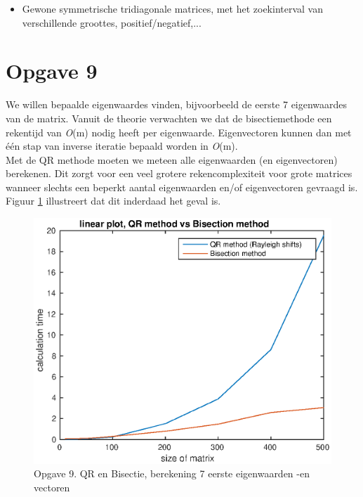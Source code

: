 \documentclass[]{article}
\newcommand{\opgave}[1]{\pagebreak\section*{Opgave #1}}
\begin{document}
\begin{itemize}
	\item Gewone symmetrische tridiagonale matrices, met het zoekinterval van verschillende groottes, positief/negatief,...
\end{itemize}

\opgave{9}
We willen bepaalde eigenwaardes vinden, bijvoorbeeld de eerste 7 eigenwaardes van de matrix. Vanuit de theorie verwachten we dat de bisectiemethode een rekentijd van \textit{O}(m) nodig heeft per eigenwaarde. Eigenvectoren kunnen dan met \'{e}\'{e}n stap van inverse iteratie bepaald worden in \textit{O}(m).\\
Met de QR methode moeten we meteen alle eigenwaarden (en eigenvectoren) berekenen. Dit zorgt voor een veel grotere rekencomplexiteit voor grote matrices wanneer slechts een beperkt aantal eigenwaarden en/of eigenvectoren gevraagd is.
Figuur \ref{opgave9} illustreert dat dit inderdaad het geval is.

\begin{figure}[h]
\begin{center}
\includegraphics[width=1\textwidth]{opgave9lin.eps}
\end{center}
\caption{Opgave 9. QR en Bisectie, berekening 7 eerste eigenwaarden -en vectoren}
\label{opgave9}
\end{figure}
\end{document}
